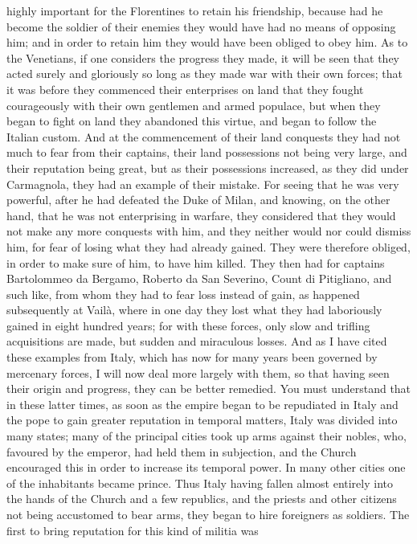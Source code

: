 \documentclass[12pt,letterpaper]{memoir}
\begin{document}
highly important for the Florentines to retain his friendship, because
had he become the soldier of their enemies they would have had no
means of opposing him; and in order to retain him they would have been
obliged to obey him. As to the Venetians, if one considers the progress
they made, it will be seen that they acted surely and gloriously so
long as they made war with their own forces; that it was before they
commenced their enterprises on land that they fought courageously with
their own gentlemen and armed populace, but when they began to fight
on land they abandoned this virtue, and began to follow the Italian
custom. And at the commencement of their land conquests they had not
much to fear from their captains, their land possessions not being
very large, and their reputation being great, but as their possessions
increased, as they did under Carmagnola, they had an example of their
mistake. For seeing that he was very powerful, after he had defeated
the Duke of Milan, and knowing, on the other hand, that he was not
enterprising in warfare, they considered that they would not make any
more conquests with him, and they neither would nor could dismiss him,
for fear of losing what they had already gained. They were therefore
obliged, in order to make sure of him, to have him killed. They then
had for captains Bartolommeo da Bergamo, Roberto da San Severino, Count
di Pitigliano, and such like, from whom they had to fear loss instead
of gain, as happened subsequently at Vailà, where in one day they lost
what they had laboriously gained in eight hundred years; for with these
forces, only slow and trifling acquisitions are made, but sudden and
miraculous losses. And as I have cited these examples from Italy,
which has now for many years been governed by mercenary forces, I will
now deal more largely with them, so that having seen their origin and
progress, they can be better remedied. You must understand that in
these latter times, as soon as the empire began to be repudiated in
Italy and the pope to gain greater reputation in temporal matters,
Italy was divided into many states; many of the principal cities took
up arms against their nobles, who, favoured by the emperor, had held
them in subjection, and the Church encouraged this in order to increase
its temporal power. In many other cities one of the inhabitants became
prince. Thus Italy having fallen almost entirely into the hands of
the Church and a few republics, and the priests and other citizens
not being accustomed to bear arms, they began to hire foreigners as
soldiers. The first to bring reputation for this kind of militia was
\end{document}
